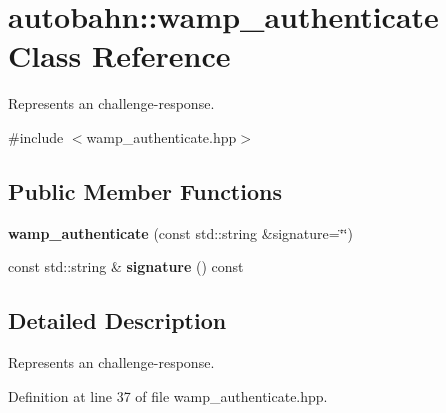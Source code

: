 \hypertarget{classautobahn_1_1wamp__authenticate}{}\section{autobahn\+:\+:wamp\+\_\+authenticate Class Reference}
\label{classautobahn_1_1wamp__authenticate}


Represents an challenge-\/response.  




{\ttfamily \#include $<$wamp\+\_\+authenticate.\+hpp$>$}

\subsection*{Public Member Functions}
\begin{DoxyCompactItemize}
\item 
{\bfseries wamp\+\_\+authenticate} (const std\+::string \&signature=\char`\"{}\char`\"{})\hypertarget{classautobahn_1_1wamp__authenticate_abda39a871140cf2bd473b4bb41b046d5}{}\label{classautobahn_1_1wamp__authenticate_abda39a871140cf2bd473b4bb41b046d5}

\item 
const std\+::string \& {\bfseries signature} () const \hypertarget{classautobahn_1_1wamp__authenticate_a36a0b889959777addcc0d96b43fe8c89}{}\label{classautobahn_1_1wamp__authenticate_a36a0b889959777addcc0d96b43fe8c89}

\end{DoxyCompactItemize}


\subsection{Detailed Description}
Represents an challenge-\/response. 

Definition at line 37 of file wamp\+\_\+authenticate.\+hpp.

